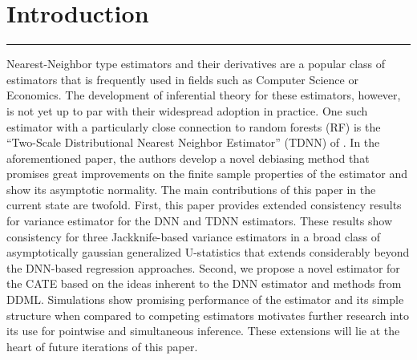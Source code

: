 \section{Introduction}
\hrule
Nearest-Neighbor type estimators and their derivatives are a popular class of estimators that is frequently used in fields such as Computer Science or Economics.
The development of inferential theory for these estimators, however, is not yet up to par with their widespread adoption in practice.
One such estimator with a particularly close connection to random forests (RF) is the ``Two-Scale Distributional Nearest Neighbor Estimator'' (TDNN) of \citet{demirkaya_optimal_2024}.
In the aforementioned paper, the authors develop a novel debiasing method that promises great improvements on the finite sample properties of the estimator and show its asymptotic normality.
The main contributions of this paper in the current state are twofold.
First, this paper provides extended consistency results for variance estimator for the DNN and TDNN estimators.
These results show consistency for three Jackknife-based variance estimators in a broad class of asymptotically gaussian generalized U-statistics that extends considerably beyond the DNN-based regression approaches.
Second, we propose a novel estimator for the CATE based on the ideas inherent to the DNN estimator and methods from DDML.
Simulations show promising performance of the estimator and its simple structure when compared to competing estimators motivates further research into its use for pointwise and simultaneous inference.
These extensions will lie at the heart of future iterations of this paper.

